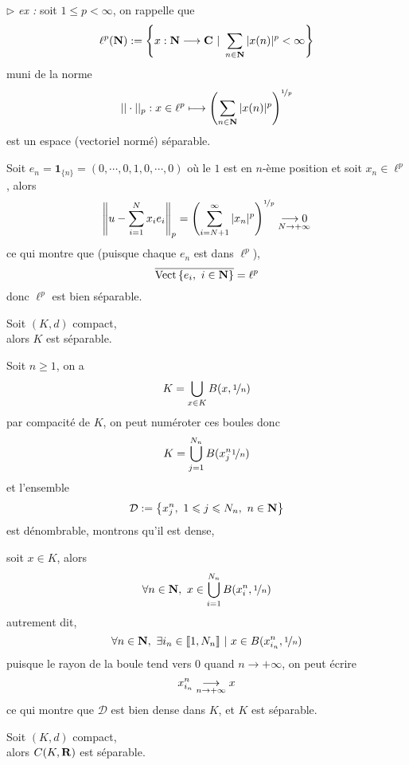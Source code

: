 \documentclass[a4paper,11pt, twoside]{article}
\begin{document}
$\triangleright$\emph{ ex : }soit $1\leqslant p<\infty$, on rappelle que 
$$\ell^p(\N):=\left\{x:\N\longrightarrow\C\ |\ \sum_{n\in\N}|x(n)|^p<\infty\right\}$$
muni de la norme
$$||\cdot||_p:x\in\ell^p\longmapsto\left(\sum_{n\in\mathbf N}|x(n)|^p\right)^{\nicefrac{1}{p}}$$
est un espace (vectoriel normé) séparable.


\begin{Proof}
  Soit $e_n=\mathbf 1_{\{n\}}=(0,\cdots,0,1,0,\cdots,0)$ où le $1$ est en $n$-ème position et soit $x_n\in\ell^p$, alors 
  $$\left\lVert u-\sum_{i=1}^Nx_ie_i\right\rVert_p=\left(\sum_{i=N+1}^{\infty}|x_n|^p\right)^{\nicefrac{1}{p}}\underset{N\to+\infty}{\longrightarrow 0}$$
  ce qui montre que (puisque chaque $e_n$ est dans $\ell^p$),
  $$\overline{\mathrm{Vect}\left\{e_i,\ i\in \mathbf N\right\}}=\ell^p$$
  donc $\ell^p$ est bien séparable.
\end{Proof}


\begin{lemme}
  Soit $(K,d)$ compact,\\

  alors $K$ est séparable.
\end{lemme}

\begin{Proof}
  Soit $n\geqslant 1$, on a 
  $$K=\bigcup_{x\in K}B(x,\nicefrac{1}{n})$$
  par compacité de $K$, on peut numéroter ces boules donc 
  $$K=\bigcup_{j=1}^{N_n}B(x_j^n\nicefrac{1}{n})$$
  et l'ensemble 
  $$\mathcal D:=\left\{x_j^n,\ 1\leqslant j\leqslant N_n,\ n\in\N\right\}$$
  est dénombrable, montrons qu'il est dense,

  soit $x\in K$, alors 
  $$\forall n\in\N,\ x\in\bigcup_{i=1}^{N_n}B(x_i^n, \nicefrac{1}{n})$$
  autrement dit, 
  $$\forall n\in\mathbf N,\ \exists i_n\in\llbracket 1,N_n\rrbracket\ |\ x\in B(x_{i_n}^n,\nicefrac{1}{n})$$
  puisque le rayon de la boule tend vers $0$ quand $n\to+\infty$, on peut écrire 
  $$x_{i_n}^n\underset{n\to+\infty}{\longrightarrow} x$$
  ce qui montre que $\mathcal D$ est bien dense dans $K$, et $K$ est séparable.
\end{Proof}


\begin{lemme}
  Soit $(K,d)$ compact,\\

  alors $C(K,\mathbf R)$ est séparable.
\end{lemme}
\end{document}
